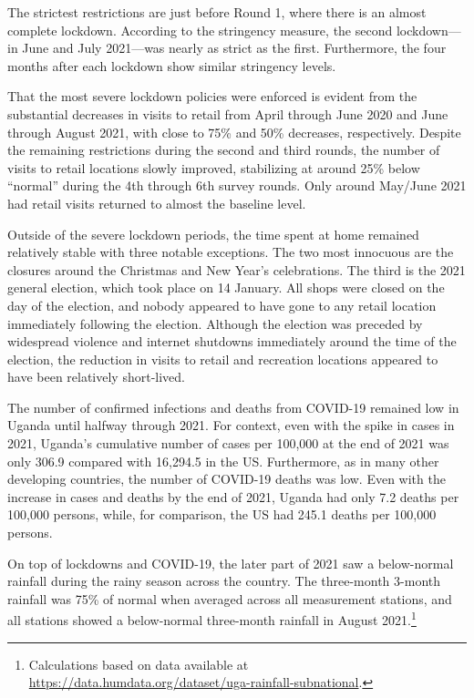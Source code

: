 \documentclass{wber}
\begin{document}
The strictest restrictions are just before Round 1, where there is an
almost complete lockdown. According to the stringency measure, the
second lockdown---in June and July 2021---was nearly as strict as the
first. Furthermore, the four months after each lockdown show similar
stringency levels.

That the most severe lockdown policies were enforced is evident from the
substantial decreases in visits to retail from April through June 2020
and June through August 2021, with close to 75\% and 50\% decreases,
respectively. Despite the remaining restrictions during the second and
third rounds, the number of visits to retail locations slowly improved,
stabilizing at around 25\% below ``normal'' during the 4th through 6th
survey rounds. Only around May/June 2021 had retail visits returned to
almost the baseline level.

Outside of the severe lockdown periods, the time spent at home remained
relatively stable with three notable exceptions. The two most innocuous
are the closures around the Christmas and New Year's celebrations. The
third is the 2021 general election, which took place on 14 January. All
shops were closed on the day of the election, and nobody appeared to
have gone to any retail location immediately following the election.
Although the election was preceded by widespread violence and internet
shutdowns immediately around the time of the election, the reduction in
visits to retail and recreation locations appeared to have been
relatively short-lived.

The number of confirmed infections and deaths from COVID-19 remained low
in Uganda until halfway through 2021. For context, even with the spike
in cases in 2021, Uganda's cumulative number of cases per 100,000 at the
end of 2021 was only 306.9 compared with 16,294.5 in the US.
Furthermore, as in many other developing countries, the number of
COVID-19 deaths was low. Even with the increase in cases and deaths by
the end of 2021, Uganda had only 7.2 deaths per 100,000 persons, while,
for comparison, the US had 245.1 deaths per 100,000 persons.

On top of lockdowns and COVID-19, the later part of 2021 saw a
below-normal rainfall during the rainy season across the country. The
three-month 3-month rainfall was 75\% of normal when averaged across all
measurement stations, and all stations showed a below-normal three-month
rainfall in August 2021.\footnote{Calculations based on data available
  at
  \href{https://data.humdata.org/dataset/uga-rainfall-subnational}{https://data.humdata.org/dataset/uga-rainfall-subnational}.}
\end{document}
